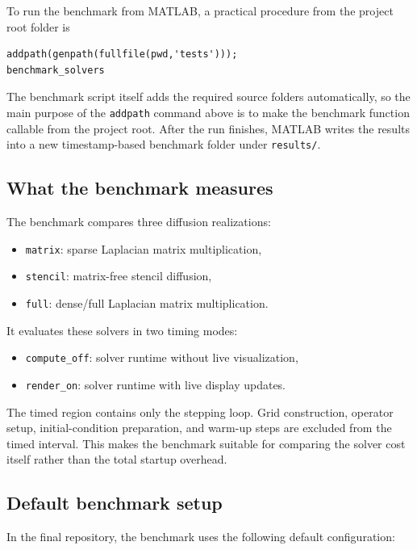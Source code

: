 To run the benchmark from MATLAB, a practical procedure from the project root folder is

\begin{verbatim}
addpath(genpath(fullfile(pwd,'tests')));
benchmark_solvers
\end{verbatim}

The benchmark script itself adds the required source folders automatically, so the main purpose of the \texttt{addpath} command above is to make the benchmark function callable from the project root. After the run finishes, MATLAB writes the results into a new timestamp-based benchmark folder under \texttt{results/}.

\subsection*{What the benchmark measures}

The benchmark compares three diffusion realizations:

\begin{itemize}
    \item \texttt{matrix}: sparse Laplacian matrix multiplication,
    \item \texttt{stencil}: matrix-free stencil diffusion,
    \item \texttt{full}: dense/full Laplacian matrix multiplication.
\end{itemize}

It evaluates these solvers in two timing modes:

\begin{itemize}
    \item \texttt{compute\_off}: solver runtime without live visualization,
    \item \texttt{render\_on}: solver runtime with live display updates.
\end{itemize}

The timed region contains only the stepping loop. Grid construction, operator setup, initial-condition preparation, and warm-up steps are excluded from the timed interval. This makes the benchmark suitable for comparing the solver cost itself rather than the total startup overhead.

\subsection*{Default benchmark setup}

In the final repository, the benchmark uses the following default configuration:

